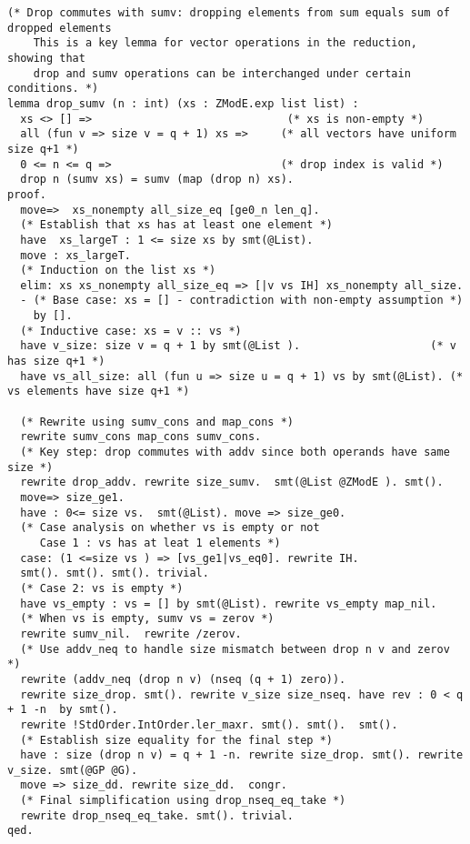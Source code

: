 \begin{lstlisting}[style=easycrypt, caption=Proof of Drop-Sumv Commutativity, breaklines=true, breakatwhitespace=true, frame=single, keepspaces=true]
(* Drop commutes with sumv: dropping elements from sum equals sum of dropped elements
    This is a key lemma for vector operations in the reduction, showing that
    drop and sumv operations can be interchanged under certain conditions. *)
lemma drop_sumv (n : int) (xs : ZModE.exp list list) :
  xs <> [] =>                              (* xs is non-empty *)
  all (fun v => size v = q + 1) xs =>     (* all vectors have uniform size q+1 *)
  0 <= n <= q =>                          (* drop index is valid *)
  drop n (sumv xs) = sumv (map (drop n) xs).
proof.
  move=>  xs_nonempty all_size_eq [ge0_n len_q].
  (* Establish that xs has at least one element *)
  have  xs_largeT : 1 <= size xs by smt(@List).
  move : xs_largeT.
  (* Induction on the list xs *)
  elim: xs xs_nonempty all_size_eq => [|v vs IH] xs_nonempty all_size.
  - (* Base case: xs = [] - contradiction with non-empty assumption *)
    by []. 
  (* Inductive case: xs = v :: vs *)
  have v_size: size v = q + 1 by smt(@List ).                    (* v has size q+1 *)
  have vs_all_size: all (fun u => size u = q + 1) vs by smt(@List). (* vs elements have size q+1 *)
  
  (* Rewrite using sumv_cons and map_cons *)
  rewrite sumv_cons map_cons sumv_cons.
  (* Key step: drop commutes with addv since both operands have same size *)
  rewrite drop_addv. rewrite size_sumv.  smt(@List @ZModE ). smt().
  move=> size_ge1.
  have : 0<= size vs.  smt(@List). move => size_ge0.
  (* Case analysis on whether vs is empty or not
     Case 1 : vs has at leat 1 elements *)
  case: (1 <=size vs ) => [vs_ge1|vs_eq0]. rewrite IH.
  smt(). smt(). smt(). trivial.
  (* Case 2: vs is empty *)
  have vs_empty : vs = [] by smt(@List). rewrite vs_empty map_nil.
  (* When vs is empty, sumv vs = zerov *)
  rewrite sumv_nil.  rewrite /zerov.
  (* Use addv_neq to handle size mismatch between drop n v and zerov *)
  rewrite (addv_neq (drop n v) (nseq (q + 1) zero)).
  rewrite size_drop. smt(). rewrite v_size size_nseq. have rev : 0 < q + 1 -n  by smt().
  rewrite !StdOrder.IntOrder.ler_maxr. smt(). smt().  smt().
  (* Establish size equality for the final step *)
  have : size (drop n v) = q + 1 -n. rewrite size_drop. smt(). rewrite v_size. smt(@GP @G).
  move => size_dd. rewrite size_dd.  congr. 
  (* Final simplification using drop_nseq_eq_take *)
  rewrite drop_nseq_eq_take. smt(). trivial.
qed.
\end{lstlisting}

